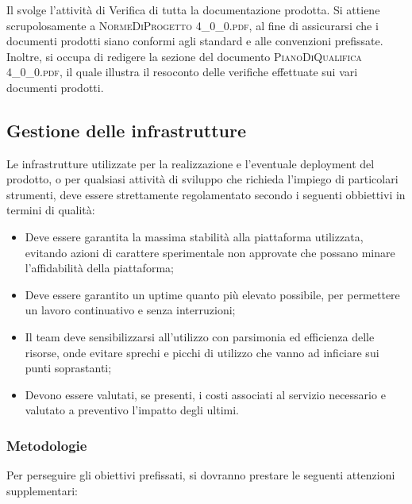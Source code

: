 		\subsubsection{\Ver}
		Il \textit{\Ver} svolge l'attività di Verifica di tutta la documentazione prodotta. Si attiene scrupolosamente a \textsc{NormeDiProgetto 4\_0\_0.pdf}, al fine di assicurarsi che i documenti prodotti siano conformi agli standard e alle convenzioni prefissate.\\
		Inoltre, si occupa di redigere la sezione del documento \textsc{PianoDiQualifica 4\_0\_0.pdf}, il quale illustra il resoconto delle verifiche effettuate sui vari documenti prodotti.

	\newpage
	\subsection{Gestione delle infrastrutture}
	Le infrastrutture utilizzate per la realizzazione e l'eventuale deployment del prodotto, o per qualsiasi attività di sviluppo che richieda l'impiego di particolari strumenti, deve essere strettamente regolamentato secondo i seguenti obbiettivi in termini di qualità:
	
	\begin{itemize}
		\item Deve essere garantita la massima stabilità alla piattaforma utilizzata, evitando azioni di carattere sperimentale non approvate che possano minare l'affidabilità della piattaforma;
		\item Deve essere garantito un uptime quanto più elevato possibile, per permettere un lavoro continuativo e senza interruzioni;
		\item Il team deve sensibilizzarsi all'utilizzo con parsimonia ed efficienza delle risorse, onde evitare sprechi e picchi di utilizzo che vanno ad inficiare sui punti soprastanti;
		\item Devono essere valutati, se presenti, i costi associati al servizio necessario e valutato a preventivo l'impatto degli ultimi.
	\end{itemize}

	\subsubsection{Metodologie}
	Per perseguire gli obiettivi prefissati, si dovranno prestare le seguenti attenzioni supplementari:
	
